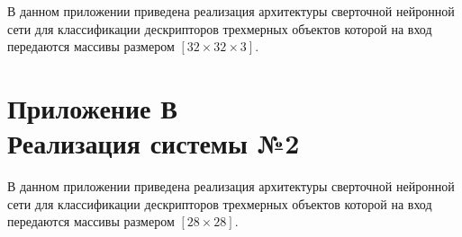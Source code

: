 \documentclass[14pt]{article}
\numberwithin{figure}{section}
\numberwithin{equation}{section}
\begin{document}
В данном приложении приведена реализация архитектуры сверточной нейронной сети для классификации дескрипторов трехмерных объектов которой на вход передаются массивы размером $[32 \times 32 \times 3]$.

 

\newpage
{}
\section*{Приложение В\\Реализация системы №2}

В данном приложении приведена реализация архитектуры сверточной нейронной сети для классификации дескрипторов трехмерных объектов которой на вход передаются массивы размером $[28 \times 28]$.



\end{document}
